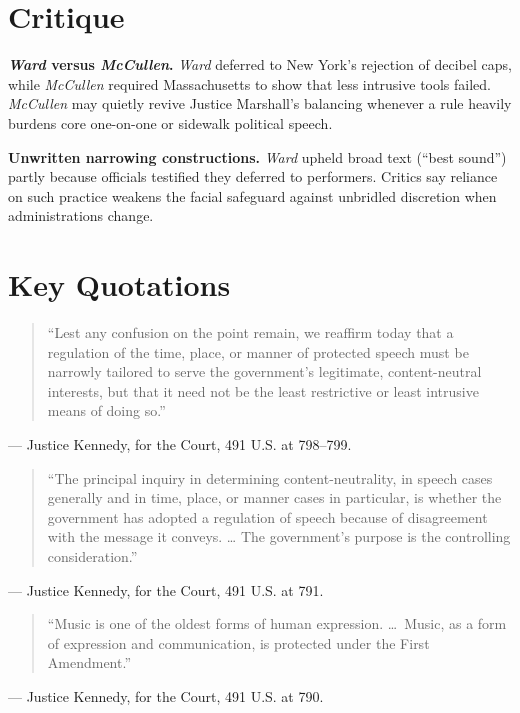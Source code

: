 \documentclass[12pt]{article}
\begin{document}
\section{Critique}

\textbf{\textit{Ward} versus \textit{McCullen}.} \textit{Ward} deferred to New York's rejection of decibel caps, while \textit{McCullen} required Massachusetts to show that less intrusive tools failed. \textit{McCullen} may quietly revive Justice Marshall's balancing whenever a rule heavily burdens core one-on-one or sidewalk political speech.

\textbf{Unwritten narrowing constructions.} \textit{Ward} upheld broad text (``best sound'') partly because officials testified they deferred to performers. Critics say reliance on such practice weakens the facial safeguard against unbridled discretion when administrations change.

\section{Key Quotations}

\begin{quote}
``Lest any confusion on the point remain, we reaffirm today that a regulation of the time, place, or manner of protected speech must be narrowly tailored to serve the government's legitimate, content-neutral interests, but that it need not be the least restrictive or least intrusive means of doing so.''
\end{quote}
\noindent --- Justice Kennedy, for the Court, 491 U.S. at 798--799.

\begin{quote}
``The principal inquiry in determining content-neutrality, in speech cases generally and in time, place, or manner cases in particular, is whether the government has adopted a regulation of speech because of disagreement with the message it conveys. \dots{} The government's purpose is the controlling consideration.''
\end{quote}
\noindent --- Justice Kennedy, for the Court, 491 U.S. at 791.

\begin{quote}
``Music is one of the oldest forms of human expression. \dots\ Music, as a form of expression and communication, is protected under the First Amendment.''
\end{quote}
\noindent --- Justice Kennedy, for the Court, 491 U.S. at 790.
\end{document}
